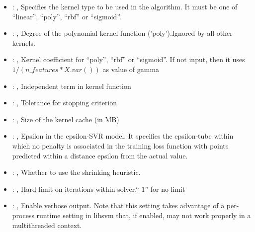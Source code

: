 \begin{itemize}
    \item {}: , 
      Specifies the kernel type to be used in the algorithm. It must be one of
      ``linear'', ``poly'', ``rbf'' or ``sigmoid''.

    \item {}: , 
      Degree of the polynomial kernel function ('poly').Ignored by all other kernels.

    \item {}: , 
      Kernel coefficient for ``poly'', ``rbf'' or ``sigmoid''. If not input, then it uses
      $1 / (n\_features * X.var())$ as value of gamma

    \item {}: , 
      Independent term in kernel function

    \item {}: , 
      Tolerance for stopping criterion

    \item {}: , 
      Size of the kernel cache (in MB)

    \item {}: , 
      Epsilon in the epsilon-SVR model. It specifies the epsilon-tube
      within which no penalty is associated in the training loss function
      with points predicted within a distance epsilon from the actual
      value.

    \item {}: , 
      Whether to use the shrinking heuristic.

    \item {}: , 
      Hard limit on iterations within solver.``-1'' for no limit

    \item {}: , 
      Enable verbose output. Note that this setting takes advantage
      of a per-process runtime setting in libsvm that, if enabled, may not
      work properly in a multithreaded context.
  \end{itemize}


